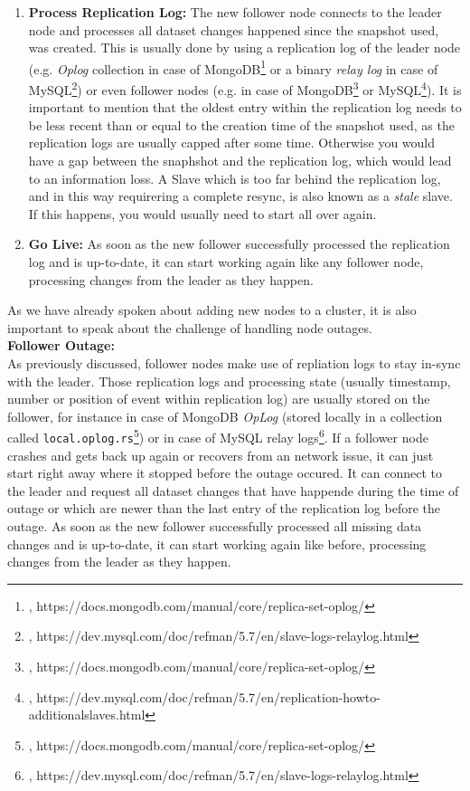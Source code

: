 {\begin{enumerate}
\item \textbf{Process Replication Log:} The new follower node connects to the leader node and processes all dataset changes happened since the snapshot used, was created. This is usually done by using a replication log of the leader node (e.g. \textit{Oplog} collection in case of MongoDB\footnote{\cite{MDBRSOL}, https://docs.mongodb.com/manual/core/replica-set-oplog/} or a binary \textit{relay log} in case of MySQL\footnote{\cite{MYSQLRL}, https://dev.mysql.com/doc/refman/5.7/en/slave-logs-relaylog.html}) or even follower nodes (e.g. in case of MongoDB\footnote{\cite{MDBRSOL}, https://docs.mongodb.com/manual/core/replica-set-oplog/} or MySQL\footnote{\cite{MYSQLNS}, https://dev.mysql.com/doc/refman/5.7/en/replication-howto-additionalslaves.html}). It is important to mention that the oldest entry within the replication log needs to be less recent than or equal to the creation time of the snapshot used, as the replication logs are usually capped after some time. Otherwise you would have a gap between the snaphshot and the replication log, which would lead to an information loss. A Slave which is too far behind the replication log, and in this way requirering a complete resync, is also known as a \textit{stale} slave. If this happens, you would usually need to start all over again.
\item \textbf{Go Live:} As soon as the new follower successfully processed the replication log and is up-to-date, it can start working again like any follower node, processing changes from the leader as they happen.\\
\end{enumerate}

As we have already spoken about adding new nodes to a cluster, it is also important to speak about the challenge of handling node outages.\\

\textbf{Follower Outage:}\\
As previously discussed, follower nodes make use of repliation logs to stay in-sync with the leader. Those replication logs and processing state (usually timestamp, number or position of event within replication log) are usually stored on the follower, for instance in case of MongoDB \textit{OpLog} (stored locally in a collection called \lstinline{local.oplog.rs}\footnote{\cite{MDBRSOL}, https://docs.mongodb.com/manual/core/replica-set-oplog/}) or in case of MySQL relay logs\footnote{\cite{MYSQLRL}, https://dev.mysql.com/doc/refman/5.7/en/slave-logs-relaylog.html}. If a follower node crashes and gets back up again or recovers from an network issue, it can just start right away where it stopped before the outage occured. It can connect to the leader and request all dataset changes that have happende during the time of outage or which are newer than the last entry of the replication log before the outage. As soon as the new follower successfully processed all missing data changes and is up-to-date, it can start working again like before, processing changes from the leader as they happen.\\

}
